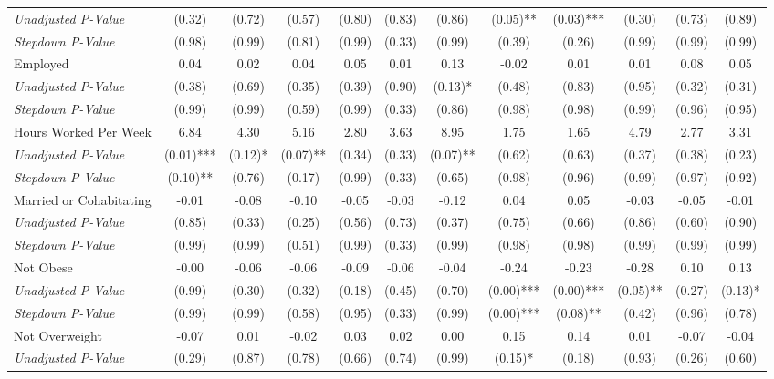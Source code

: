 \begin{tabular}{l c c c c c c c c c c c}
\quad \textit{Unadjusted P-Value} & (0.32) & (0.72) & (0.57) & (0.80) & (0.83) & (0.86) & (0.05)** & (0.03)*** & (0.30) & (0.73) & (0.89) \\
\quad \textit{Stepdown P-Value} & (0.98) & (0.99) & (0.81) & (0.99) & (0.33) & (0.99) & (0.39) & (0.26) & (0.99) & (0.99) & (0.99) \\
Employed & 0.04 & 0.02 & 0.04 & 0.05 & 0.01 & 0.13 & -0.02 & 0.01 & 0.01 & 0.08 & 0.05 \\
\quad \textit{Unadjusted P-Value} & (0.38) & (0.69) & (0.35) & (0.39) & (0.90) & (0.13)* & (0.48) & (0.83) & (0.95) & (0.32) & (0.31) \\
\quad \textit{Stepdown P-Value} & (0.99) & (0.99) & (0.59) & (0.99) & (0.33) & (0.86) & (0.98) & (0.98) & (0.99) & (0.96) & (0.95) \\
Hours Worked Per Week & 6.84 & 4.30 & 5.16 & 2.80 & 3.63 & 8.95 & 1.75 & 1.65 & 4.79 & 2.77 & 3.31 \\
\quad \textit{Unadjusted P-Value} & (0.01)*** & (0.12)* & (0.07)** & (0.34) & (0.33) & (0.07)** & (0.62) & (0.63) & (0.37) & (0.38) & (0.23) \\
\quad \textit{Stepdown P-Value} & (0.10)** & (0.76) & (0.17) & (0.99) & (0.33) & (0.65) & (0.98) & (0.96) & (0.99) & (0.97) & (0.92) \\
Married or Cohabitating & -0.01 & -0.08 & -0.10 & -0.05 & -0.03 & -0.12 & 0.04 & 0.05 & -0.03 & -0.05 & -0.01 \\
\quad \textit{Unadjusted P-Value} & (0.85) & (0.33) & (0.25) & (0.56) & (0.73) & (0.37) & (0.75) & (0.66) & (0.86) & (0.60) & (0.90) \\
\quad \textit{Stepdown P-Value} & (0.99) & (0.99) & (0.51) & (0.99) & (0.33) & (0.99) & (0.98) & (0.98) & (0.99) & (0.99) & (0.99) \\
Not Obese & -0.00 & -0.06 & -0.06 & -0.09 & -0.06 & -0.04 & -0.24 & -0.23 & -0.28 & 0.10 & 0.13 \\
\quad \textit{Unadjusted P-Value} & (0.99) & (0.30) & (0.32) & (0.18) & (0.45) & (0.70) & (0.00)*** & (0.00)*** & (0.05)** & (0.27) & (0.13)* \\
\quad \textit{Stepdown P-Value} & (0.99) & (0.99) & (0.58) & (0.95) & (0.33) & (0.99) & (0.00)*** & (0.08)** & (0.42) & (0.96) & (0.78) \\
Not Overweight & -0.07 & 0.01 & -0.02 & 0.03 & 0.02 & 0.00 & 0.15 & 0.14 & 0.01 & -0.07 & -0.04 \\
\quad \textit{Unadjusted P-Value} & (0.29) & (0.87) & (0.78) & (0.66) & (0.74) & (0.99) & (0.15)* & (0.18) & (0.93) & (0.26) & (0.60) \\

\end{tabular}
